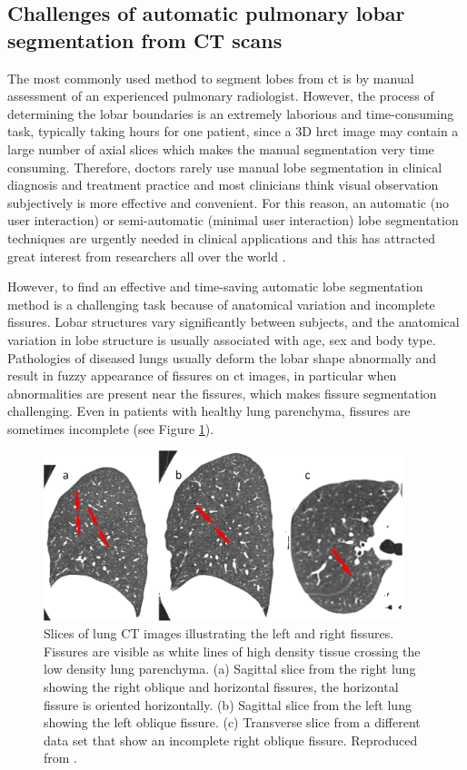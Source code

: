 \subsection{Challenges of automatic pulmonary lobar segmentation from CT scans} \label{SegmentationChallenge}
The most commonly used method to segment lobes from \gls{ct} is by manual assessment of an experienced pulmonary radiologist. However, the process of determining the lobar boundaries is an extremely laborious and time-consuming task, typically taking hours for one patient, since a 3D \gls{hrct} image may contain a large number of axial slices which makes the manual segmentation very time consuming. Therefore, doctors rarely use manual lobe segmentation in clinical diagnosis and treatment practice and most clinicians think visual observation subjectively is more effective and convenient. For this reason, an automatic (no user interaction) or semi-automatic (minimal user interaction) lobe segmentation techniques are urgently needed in clinical applications and this has attracted great interest from researchers all over the world \citep{van2013automated,pu2009computational,ukil2009anatomy}.

However, to find an effective and time-saving automatic lobe segmentation method is a challenging task because of anatomical variation and incomplete fissures. Lobar structures vary significantly between subjects, and the anatomical variation in lobe structure is usually associated with age, sex and body type. Pathologies of diseased lungs usually deform the lobar shape abnormally and result in fuzzy appearance of fissures on \gls{ct} images, in particular when abnormalities are present near the fissures, which makes fissure segmentation challenging. Even in patients with healthy lung parenchyma, fissures are sometimes incomplete \citep{gulsun2006variability, doel2015review} (see Figure \ref{fig:FissureSegmentationChanllenges}).

\begin{figure}[htbp]
  \centering 
  \includegraphics[height=1.95in]{Segmentation/Image/FissureSegmentationChanllenges.jpg}
  \caption{Slices of lung CT images illustrating the left and right fissures. Fissures are visible as white lines of high density tissue crossing the low density lung parenchyma. (a) Sagittal slice from the right lung showing the right oblique and horizontal fissures, the horizontal fissure is oriented horizontally. (b) Sagittal slice from the left lung showing the left oblique fissure. (c) Transverse slice from a different data set that show an incomplete right oblique fissure. Reproduced from \citep{ukil2009anatomy}.}
  \label{fig:FissureSegmentationChanllenges}
\end{figure}

